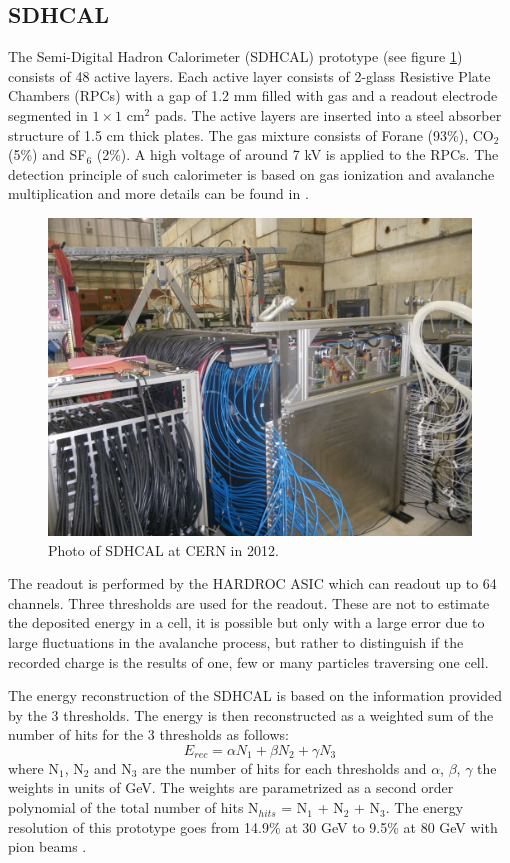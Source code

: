 \subsection{SDHCAL}

The Semi-Digital Hadron Calorimeter (SDHCAL) prototype \cite{1748-0221-10-10-P10039} (see figure \ref{fig:SDHCAL}) consists of 48 active layers. Each active layer consists of 2-glass Resistive Plate Chambers (RPCs) \cite{BEDJIDIAN2010120} with a gap of 1.2 mm filled with gas and a readout electrode segmented in $1\times1$ cm$^2$ pads. The active layers are inserted into a steel absorber structure of 1.5 cm thick plates. The gas mixture consists of Forane (93\%), CO$_2$ (5\%) and SF$_6$ (2\%). A high voltage of around 7 kV is applied to the RPCs. The detection principle of such calorimeter is based on gas ionization and avalanche multiplication and more details can be found in \cite{1748-0221-10-10-P10039}.

\begin{figure}[htbp!]
  \centering
  \includegraphics[width=0.7\linewidth]{chap3/fig/SDHCAL.jpg}
  \caption{Photo of SDHCAL at CERN in 2012.} \label{fig:SDHCAL}
\end{figure}

The readout is performed by the HARDROC ASIC \cite{HARDROC:IEEE} which can readout up to 64 channels. Three thresholds are used for the readout. These are not to estimate the deposited energy in a cell, it is possible but only with a large error due to large fluctuations in the avalanche process, but rather to distinguish if the recorded charge is the results of one, few or many particles traversing one cell.

The energy reconstruction of the SDHCAL is based on the information provided by the 3 thresholds. The energy is then reconstructed as a weighted sum of the number of hits for the 3 thresholds as follows:
\begin{equation}
  E_{rec} = \alpha N_1 + \beta N_2 + \gamma N_3
\end{equation}
where N$_1$, N$_2$ and N$_3$ are the number of hits for each thresholds and $\alpha$, $\beta$, $\gamma$ the weights in units of GeV. The weights are parametrized as a second order polynomial of the total number of hits N$_{hits}$ =  N$_1$ + N$_2$ + N$_3$. The energy resolution of this prototype goes from 14.9\% at 30 GeV to 9.5\% at 80 GeV with pion beams \cite{Buridon:2016ill}.

